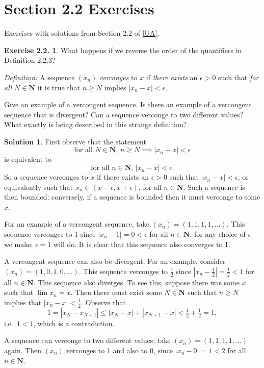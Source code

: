 \documentclass[12pt]{article}
\theoremstyle{definition}
\theoremstyle{exercise}
\newtheorem{exercise}{Exercise 2.2.}
\theoremstyle{solution}
\newtheorem*{solution}{Solution}
\newcommand{\N}{\mathbf{N}}
\begin{document}
\section{Section 2.2 Exercises}

Exercises with solutions from Section 2.2 of \hyperlink{ua}{[UA]}.

\begin{exercise}
\label{ex:1}
    What happens if we reverse the order of the quantifiers in Definition 2.2.3?

    \textit{Definition:} A sequence \( (x_n) \) \textit{verconges} to \( x \) if \textit{there exists} an \( \epsilon > 0 \) such that \textit{for all} \( N \in \N \) it is true that \( n \geq N \) implies \( |x_n - x| < \epsilon \).

    Give an example of a vercongent sequence. Is there an example of a vercongent sequence that is divergent? Can a sequence verconge to two different values? What exactly is being described in this strange definition?
\end{exercise}

\begin{solution}
    First observe that the statement
    \[
        \text{for all } N \in \N,\, n \geq N \implies |x_n - x| < \epsilon
    \]
    is equivalent to
    \[
        \text{for all } n \in \N,\, |x_n - x| < \epsilon.
    \]
    So a sequence verconges to \( x \) if there exists an \( \epsilon > 0 \) such that \( |x_n - x| < \epsilon \), or equivalently such that \( x_n \in (x - \epsilon, x + \epsilon) \), for all \( n \in \N \). Such a sequence is then bounded; conversely, if a sequence is bounded then it must verconge to some \( x \).

    For an example of a vercongent sequence, take \( (x_n) = (1, 1, 1, 1, \ldots) \). This sequence verconges to 1 since \( |x_n - 1| = 0 < \epsilon \) for all \( n \in \N \), for any choice of \( \epsilon \) we make; \( \epsilon = 1 \) will do. It is clear that this sequence also converges to 1.

    A vercongent sequence can also be divergent. For an example, consider \( (x_n) = (1, 0, 1, 0, \ldots) \). This sequence verconges to \( \tfrac{1}{2} \) since \( |x_n - \tfrac{1}{2}| = \tfrac{1}{2} < 1 \) for all \( n \in \N \). This sequence also diverges. To see this, suppose there was some \( x \) such that \( \lim x_n = x \). Then there must exist some \( N \in \N \) such that \( n \geq N \) implies that \( |x_n - x| < \tfrac{1}{2} \). Observe that
    \[
        1 = |x_N - x_{N+1}| \leq |x_N - x| + |x_{N+1} - x| < \tfrac{1}{2} + \tfrac{1}{2} = 1,
    \]
    i.e.\ \( 1 < 1 \), which is a contradiction.

    A sequence can verconge to two different values; take \( (x_n) = (1, 1, 1, 1, \ldots) \) again. Then \( (x_n) \) verconges to 1 and also to 0, since \( |x_n - 0| = 1 < 2 \) for all \( n \in \N \).
\end{solution}
\end{document}
